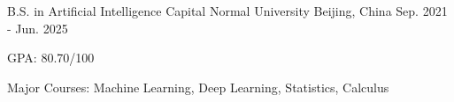 

\begin{cventries}

  \cventry
    {B.S. in Artificial Intelligence} %
    {Capital Normal University} %
    {Beijing, China} %
    {Sep. 2021 - Jun. 2025} %
    {
      \begin{cvitems} %
        \item {GPA: 80.70/100}
        \item {Major Courses: Machine Learning, Deep Learning, Statistics, Calculus}
      \end{cvitems}
    }

\end{cventries}
